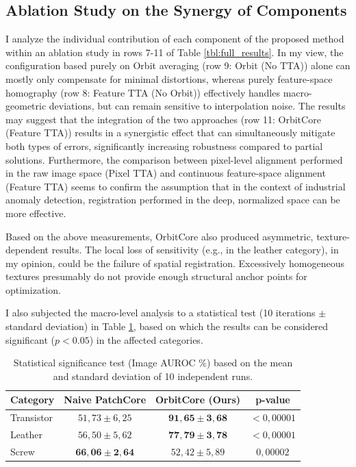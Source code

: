 \documentclass{article}
\begin{document}
	\subsection{Ablation Study on the Synergy of Components}
	I analyze the individual contribution of each component of the proposed method within an ablation study in rows 7-11 of Table \ref{tbl:full_results}. In my view, the configuration based purely on Orbit averaging (row 9: Orbit (No TTA)) alone can mostly only compensate for minimal distortions, whereas purely feature-space homography (row 8: Feature TTA (No Orbit)) effectively handles macro-geometric deviations, but can remain sensitive to interpolation noise. The results may suggest that the integration of the two approaches (row 11: OrbitCore (Feature TTA)) results in a synergistic effect that can simultaneously mitigate both types of errors, significantly increasing robustness compared to partial solutions. Furthermore, the comparison between pixel-level alignment performed in the raw image space (Pixel TTA) and continuous feature-space alignment (Feature TTA) seems to confirm the assumption that in the context of industrial anomaly detection, registration performed in the deep, normalized space can be more effective.
	
	Based on the above measurements, OrbitCore also produced asymmetric, texture-dependent results. The local loss of sensitivity (e.g., in the leather category), in my opinion, could be the failure of spatial registration. Excessively homogeneous textures presumably do not provide enough structural anchor points for optimization.
	
	I also subjected the macro-level analysis to a statistical test (10 iterations $\pm$ standard deviation) in Table \ref{tbl:stat_results}, based on which the results can be considered significant ($p < 0.05$) in the affected categories.
	
	\begin{table}[h]
		\centering
		\caption{Statistical significance test (Image AUROC \%) based on the mean and standard deviation of 10 independent runs.}
		\label{tbl:stat_results}
		\begin{tabular}{lccc}
			\toprule
			\textbf{Category} & \textbf{Naive PatchCore} & \textbf{OrbitCore (Ours)} & \textbf{p-value} \\
			\midrule
			Transistor & $51,73 \pm 6,25$ & $\mathbf{91,65 \pm 3,68}$ & $< 0,00001$ \\
			Leather    & $56,50 \pm 5,62$ & $\mathbf{77,79 \pm 3,78}$ & $< 0,00001$ \\
			Screw      & $\mathbf{66,06 \pm 2,64}$ & $52,42 \pm 5,89$ & $0,00002$ \\
			\bottomrule
		\end{tabular}
	\end{table}
	
\end{document}
